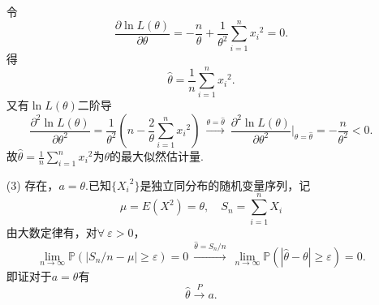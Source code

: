 \documentclass{article}
\begin{document}
\begin{enumerate}
\[    \]
    令
    \[
        \frac{\partial \ln L(\theta)}{\partial \theta}
        = -\frac{n}{\theta} + \frac{1}{\theta^2} \sum\limits_{i=1}^{n} {x_i}^2   
        = 0.  
    \]
    得
    \[
        \widehat{\theta} = \frac{1}{n} \sum\limits_{i=1}^{n} {x_i}^2 .
    \]
    又有$\ln L(\theta)$二阶导
    \[
        \frac{\partial^2 \ln L(\theta)}{\partial \theta^2}
        = \frac{1}{\theta^2}\left(n - \frac{2}{\theta}\sum\limits_{i=1}^{n} {x_i}^2 \right)
        \ \xrightarrow{\theta = \widehat{\theta}}\ 
        \frac{\partial^2 \ln L(\theta)}{\partial \theta^2} {\big|}_{\theta = \widehat{\theta}}
        = -\frac{n}{\theta^2}
        < 0.
    \]
    故$\widehat{\theta} = \frac{1}{n} \sum\limits_{i=1}^{n} {x_i}^2$为$\theta$的最大似然估计量.
    \item [(3)]存在，$a = \theta$.已知$\{{X_i}^2\}$是独立同分布的随机变量序列，记
    \[
        \mu = E(X^2) = \theta,\quad
        S_n = \sum\limits_{i=1}^{n} X_i 
    \]
    由大数定律有，对$\forall\ \varepsilon > 0$，
    \[
        \lim\limits_{n\to \infty} \mathbb{P}\left(\left| S_n / n - \mu \right| \geq \varepsilon \right) = 0
        \ \xrightarrow{\widehat{\theta} = S_n / n }\ 
        \lim\limits_{n\to \infty} \mathbb{P}\left(\left\vert \widehat{\theta} - \theta \right\vert \geq \varepsilon \right) = 0.
    \]
    即证对于$a = \theta$有
    \[
        \widehat{\theta} \xrightarrow{P} a.    
    \]
\end{enumerate}
\end{document}
